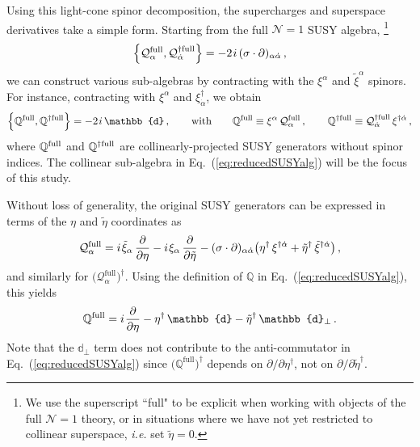 \documentclass[12pt,document,nofootinbib,superscriptaddress,onecolumn,preprintnumbers,balancelastpage]{article}
\newcommand{\s}{\hspace{0.8pt}}
\newcommand{\qq}{\mathcal{Q}}
\newcommand{\PP}{\mathbb{d}}
\DeclareRobustCommand{\Eq}[1]{Eq.~(\ref{#1})}
\newcommand{\Q}{\mathbb{Q}}
\begin{document}
\begin{spacing}{1.2}
Using this light-cone spinor decomposition, the supercharges and superspace derivatives take a simple form.
%
Starting from the full $\mathcal{N}=1$ SUSY algebra,%
%
\footnote{We use the superscript ``full" to be explicit when working with objects of the full $\mathcal{N}=1$ theory, or in situations where we have not yet restricted to collinear superspace, \emph{i.e.} set $\tilde{\eta} = 0$.} 
\begin{align}
 \Big \{ \qq_\alpha^{\rm full}, \qq^{\dagger \rm full}_{\dot{\alpha}} \Big \} =  -2\s i\, (\sigma \cdot \partial)_{\alpha \dot{\alpha}}  \, ,
\end{align}
we can construct various sub-algebras by contracting with the $\xi^\alpha$ and $\tilde{\xi}^\alpha$ spinors.
%
For instance, contracting with $\xi^\alpha$ and $\xi^\dagger_{\dot{\alpha}}$, we obtain
\begin{align}
\label{eq:reducedSUSYalg}
 \Big \{ \Q^{\rm full}, \Q^{\dagger \rm full} \Big \} =  - 2\s i\, \PP\,,  \qquad \text{with} \qquad \Q^{\rm full} \equiv \xi^\alpha\, \qq^{\rm full}_\alpha\,, \qquad \Q^{\dagger \rm full} \equiv \qq^{\dagger \rm full}_{\dot{\alpha}}\, \xi^{\dagger \dot{\alpha}}\,,
\end{align}
%
where $\Q^{\rm full}$ and $\Q^{\dagger \rm full}$ are collinearly-projected SUSY generators without spinor indices.
%
The collinear sub-algebra in \Eq{eq:reducedSUSYalg} will be the focus of this study.

Without loss of generality, the original SUSY generators can be expressed in terms of the $\eta$ and $\tilde{\eta}$ coordinates as  
\begin{align}
\qq_\alpha^\text{full} =i \s \tilde{\xi}_\alpha \,\frac{\partial}{\partial \eta} - i\s \xi_\alpha\, \frac{\partial}{\partial \tilde{\eta}} -  (\sigma \cdot \partial)_{\alpha \dot{\alpha}} \big(\eta^\dagger\, \xi^{\dagger \dot{\alpha}} + \tilde{\eta}^\dagger\, \tilde{\xi}^{\dagger \dot{\alpha}}\big) \, ,
\end{align}
and similarly for $\big(\qq^{ \text{full}}_{\alpha}\big)^\dagger$.
%
Using the definition of $\Q$ in \Eq{eq:reducedSUSYalg}, this yields
%
\begin{align}
\Q^\text{full} = i\s \frac{\partial}{\partial \eta}  - \eta^\dagger\, \PP - \tilde{\eta}^\dagger\, \PP_\perp\,. 
\end{align}
%
Note that the $\PP_\perp$ term does not contribute to the anti-commutator in \Eq{eq:reducedSUSYalg} since $\big(\Q^{ \text{full}}\big)^\dagger$ depends on $\partial/\partial \eta^\dagger$, not on $\partial/\partial \tilde{\eta}^\dagger$.


\end{spacing}
\end{document}
